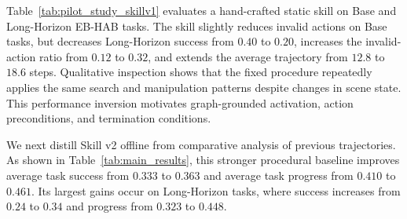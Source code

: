 Table~\ref{tab:pilot_study_skillv1} evaluates a hand-crafted static skill on Base and Long-Horizon EB-HAB tasks. The skill slightly reduces invalid actions on Base tasks, but decreases Long-Horizon success from $0.40$ to $0.20$, increases the invalid-action ratio from $0.12$ to $0.32$, and extends the average trajectory from $12.8$ to $18.6$ steps. Qualitative inspection shows that the fixed procedure repeatedly applies the same search and manipulation patterns despite changes in scene state. This performance inversion motivates graph-grounded activation, action preconditions, and termination conditions.

\begin{table}[htb]
    \centering
    \caption{Pilot Study: The Performance Inversion of Static Skillv1 (DownSample 0.1, EB-HAB). Hard-coded, static skills (Skillv1) improve short-term metrics but hinder long-horizon capability due to rigid, unadaptable execution patterns.}
    \label{tab:pilot_study_skillv1}
\end{table}

We next distill Skill v2 offline from comparative analysis of previous trajectories. As shown in Table~\ref{tab:main_results}, this stronger procedural baseline improves average task success from $0.333$ to $0.363$ and average task progress from $0.410$ to $0.461$. Its largest gains occur on Long-Horizon tasks, where success increases from $0.24$ to $0.34$ and progress from $0.323$ to $0.448$.

